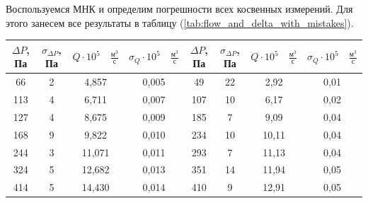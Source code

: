 \documentclass[12pt,a4paper]{article}
\begin{document}
Воспользуемся МНК и определим погрешности всех косвенных измерений. Для этого занесем все результаты в таблицу (\ref{tab:flow_and_delta_with_mistakes}).

\begin{table}[]
\centering
\begin{tabular}{|c|c|c|c|c|c|c|c|}
\hline
$ \Delta P $, Па & $ \sigma_{\Delta P} $, Па & $ Q \cdot 10^{5} \quad \frac{\text{м}^{3}}{\text{с}}$ & $\sigma_{Q}\cdot 10^5 \quad \frac{\text{м}^{3}}{\text{с}} $ & $ \Delta P $, Па & $ \sigma_{\Delta P} $, Па & $ Q \cdot 10^{5} \quad \frac{\text{м}^{3}}{\text{с}}$ & $\sigma_{Q}\cdot 10^5 \quad \frac{\text{м}^{3}}{\text{с}} $ \\ \hline
66             & 2                       & 4,857                                          & 0,005                                                  & 49                              & 22                  & 2,92           & 0,01                   \\ \hline
113            & 4                       & 6,711                                          & 0,007                                                  & 107                             & 10                  & 6,17           & 0,02                   \\ \hline
127            & 4                       & 8,675                                          & 0,009                                                  & 185                             & 7                   & 9,09           & 0,04                   \\ \hline
168            & 9                       & 9,822                                          & 0,010                                                  & 234                             & 10                  & 10,11          & 0,04                   \\ \hline
244            & 3                       & 11,071                                         & 0,011                                                  & 293                             & 7                   & 11,13          & 0,04                   \\ \hline
324            & 5                       & 12,682                                         & 0,013                                                  & 351                             & 14                  & 11,94          & 0,05                   \\ \hline
414            & 5                       & 14,430                                         & 0,014                                                  & 410                             & 9                   & 12,91          & 0,05                   \\ \hline

\end{tabular}
\end{table}
\end{document}
